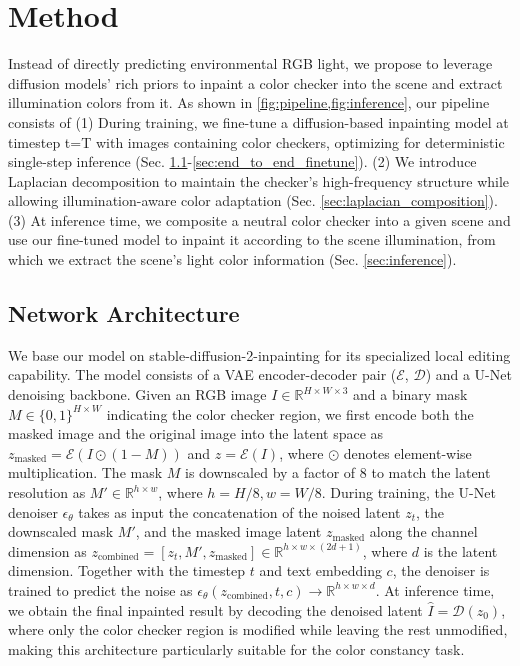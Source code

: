 \section{Method}






\label{sec:method}
Instead of directly predicting environmental RGB light, we propose to leverage diffusion models' rich priors to inpaint a color checker into the scene and extract illumination colors from it. As shown in \cref{fig:pipeline,fig:inference}, our pipeline consists of (1) During training, we fine-tune a diffusion-based inpainting model at timestep t=T with images containing color checkers, optimizing for deterministic single-step inference (Sec. \ref{sec:network_architecture}-\ref{sec:end_to_end_finetune}). (2) We introduce Laplacian decomposition to maintain the checker's high-frequency structure while allowing illumination-aware color adaptation (Sec. \ref{sec:laplacian_composition}). (3) At inference time, we composite a neutral color checker into a given scene and use our fine-tuned model to inpaint it according to the scene illumination, from which we extract the scene's light color information (Sec. \ref{sec:inference}). 


\subsection{Network Architecture}
\label{sec:network_architecture}
We base our model on stable-diffusion-2-inpainting {\cite{rombach2021highresolution}} for its specialized local editing capability. The model consists of a VAE encoder-decoder pair ($\mathcal{E}$, $\mathcal{D}$) and a U-Net denoising backbone. Given an RGB image $I \in \mathbb{R}^{H\times W\times 3}$ and a binary mask $M \in \{0,1\}^{H\times W}$ indicating the color checker region, we first encode both the masked image and the original image into the latent space as $z_{\text{masked}} =  \mathcal{E}(I \odot (1 - M))$ and $z = \mathcal{E}(I)$, where $\odot$ denotes element-wise multiplication. The mask $M$ is downscaled by a factor of 8 to match the latent resolution as $M' \in \mathbb{R}^{h\times w}$, where $h = H/8, w = W/8$. During training, the U-Net denoiser $\epsilon_\theta$ takes as input the concatenation of the noised latent $z_t$, the downscaled mask $M'$, and the masked image latent $z_{\text{masked}}$ along the channel dimension as $z_{\text{combined}} = [z_t, M', z_{\text{masked}}] \in \mathbb{R}^{h\times w\times(2d+1)}$, where $d$ is the latent dimension. Together with the timestep $t$ and text embedding $c$, the denoiser is trained to predict the noise as $\epsilon_\theta(z_{\text{combined}}, t, c) \rightarrow \mathbb{R}^{h\times w\times d}$. At inference time, we obtain the final inpainted result by decoding the denoised latent $\hat{I} = \mathcal{D}(z_0)$, where only the color checker region is modified while leaving the rest unmodified, making this architecture particularly suitable for the color constancy task.

